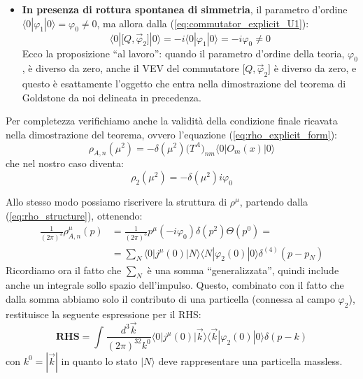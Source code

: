 \documentclass[../main.tex]{subfiles}
\begin{document}
\begin{exercise}
\begin{itemize}
    \item \textbf{In presenza di rottura spontanea di simmetria}, il parametro d'ordine $\langle0|\varphi_1|0\rangle = \varphi_0\neq 0$, ma allora dalla (\ref{eq:commutator_explicit_U1}):
    \[
    \boxed{\langle0|\big[Q, \Vec{\varphi}_2\big]|0\rangle = -i\langle0|\varphi_1|0\rangle = -i\varphi_0\neq 0}
    \]
    Ecco la proposizione “al lavoro”: quando il parametro d'ordine della teoria, $\varphi_0$, è diverso da zero, anche il VEV del commutatore $\big[Q, \Vec{\varphi}_2\big]$ è diverso da zero, e questo è esattamente l'oggetto che entra nella dimostrazione del teorema di Goldstone da noi delineata in precedenza.
    \end{itemize}

    Per completezza verifichiamo anche la validità della condizione finale ricavata nella dimostrazione del teorema, ovvero l'equazione (\ref{eq:rho_explicit_form}):
    \[
    {\rho}_{A,n}(\mu^2) = - \delta(\mu^2)\big(T^A\big)_{nm}\langle0|O_m(x)|0\rangle
    \]
    che nel nostro caso diventa:
    \begin{equation}
        \boxed{\rho_2(\mu^2) = -\delta(\mu^2)i\varphi_0}
        \label{eq:rho_explicit_form_U1}
    \end{equation}

    Allo stesso modo possiamo riscrivere la struttura di $\rho^\mu$, partendo dalla (\ref{eq:rho_structure}), ottenendo:
    \begin{equation}
        \begin{aligned}
            \frac{1}{(2\pi)^3}\rho^\mu_{A,n}(p) &= \frac{1}{(2\pi)^3}p^\mu (-i\varphi_0)\delta(p^2)\Theta(p^0) =\\ &=  \sum_N\langle 0|j^\mu(0) |N\rangle\langle N| \varphi_2(0)|0\rangle \delta^{(4)}(p-p_N)
        \end{aligned}
        \label{eq:rho_structure_U1}
    \end{equation}
    Ricordiamo ora il fatto che $\sum_N$ è una somma “generalizzata”, quindi include anche un integrale sollo spazio dell'impulso. Questo, combinato con il fatto che dalla somma abbiamo solo il contributo di una particella (connessa al campo $\varphi_2$), restituisce la seguente espressione per il RHS:
    \[
    \textbf{RHS} = \int_{}\frac{d^3\Vec{k}}{(2\pi)^32k^0}\langle 0|j^\mu(0) |\Vec{k}\rangle\langle \Vec{k}| \varphi_2(0)|0\rangle \delta(p-k)
    \]
    con $k^0=|\Vec{k}|$ in quanto lo stato $|N\rangle$ deve rappresentare una particella massless.


\end{exercise}
\end{document}
